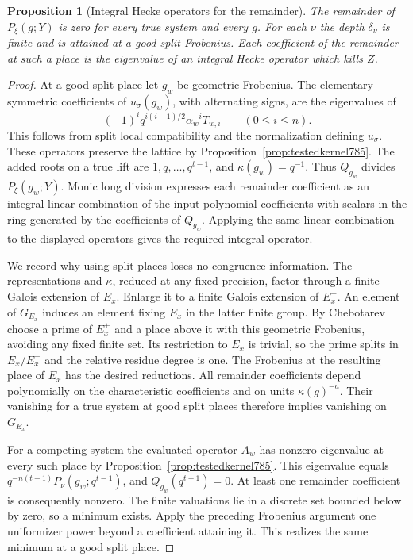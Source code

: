 \documentclass[a4paper,11pt]{article}
\newtheorem{proposition}{Proposition}[section]
\theoremstyle{definition}
\theoremstyle{remark}
\numberwithin{equation}{section}
\begin{document}
\begin{proposition}[Integral Hecke operators for the remainder]
\leavevmode\label{prop:remhecke786}
The remainder of \(P_\xi(g;Y)\) is zero for every true
system and every \(g\). For each \(\nu\) the depth
\(\delta_\nu\) is finite and is attained at a good split
Frobenius. Each coefficient of the remainder at such a
place is the eigenvalue of an integral Hecke operator
which kills \(Z\).
\end{proposition}
\begin{proof}
At a good split place let \(g_w\) be geometric Frobenius.
The elementary symmetric coefficients of \(u_\sigma(g_w)\),
with alternating signs, are the eigenvalues of
\[
            (-1)^i q^{i(i-1)/2}\alpha_w^{-i}T_{w,i}
                      \qquad(0\le i\le n).
\]
This follows from split local compatibility and the
normalization defining \(u_\sigma\). These operators
preserve the lattice by Proposition~\ref{prop:testedkernel785}.
The added roots on a true lift are \(1,q,\ldots,q^{t-1}\),
and \(\kappa(g_w)=q^{-1}\). Thus \(Q_{g_w}\) divides
\(P_\xi(g_w;Y)\). Monic long division expresses each
remainder coefficient as an integral linear combination
of the input polynomial coefficients with scalars in the
ring generated by the coefficients of \(Q_{g_w}\).
Applying the same linear combination to the displayed
operators gives the required integral operator.

We record why using split places loses no congruence
information. The representations and \(\kappa\), reduced
at any fixed precision, factor through a finite Galois
extension of \(E_x\). Enlarge it to a finite Galois
extension of \(E_x^+\). An element of \(G_{E_x}\)
induces an element fixing \(E_x\) in the latter finite
group. By Chebotarev choose a prime of \(E_x^+\) and a
place above it with this geometric Frobenius, avoiding
any fixed finite set. Its restriction to \(E_x\) is
trivial, so the prime splits in \(E_x/E_x^+\) and the
relative residue degree is one. The Frobenius at the
resulting place of \(E_x\) has the desired reductions.
All remainder coefficients depend polynomially on the
characteristic coefficients and on units
\(\kappa(g)^{-a}\). Their vanishing for a true system
at good split places therefore implies vanishing on
\(G_{E_x}\).

For a competing system the evaluated operator \(A_w\)
has nonzero eigenvalue at every such place by
Proposition~\ref{prop:testedkernel785}. This eigenvalue
equals \(q^{-n(t-1)} P_\nu(g_w;q^{t-1})\), and
\(Q_{g_w}(q^{t-1})=0\). At least one remainder coefficient
is consequently nonzero. The finite valuations lie in a
discrete set bounded below by zero, so a minimum exists.
Apply the preceding Frobenius argument one uniformizer
power beyond a coefficient attaining it. This realizes
the same minimum at a good split place.
\end{proof}
\end{document}
